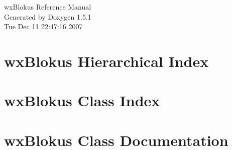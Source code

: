 \documentclass[a4paper]{book}
\begin{document}
\begin{titlepage}
\vspace*{7cm}
\begin{center}
{\Large wx\-Blokus Reference Manual}\\
\vspace*{1cm}
{\large Generated by Doxygen 1.5.1}\\
\vspace*{0.5cm}
{\small Tue Dec 11 22:47:16 2007}\\
\end{center}
\end{titlepage}
\clearemptydoublepage
{}
\tableofcontents
\clearemptydoublepage
{}
\chapter{wx\-Blokus Hierarchical Index}

\chapter{wx\-Blokus Class Index}

\chapter{wx\-Blokus Class Documentation}











\printindex
\end{document}
